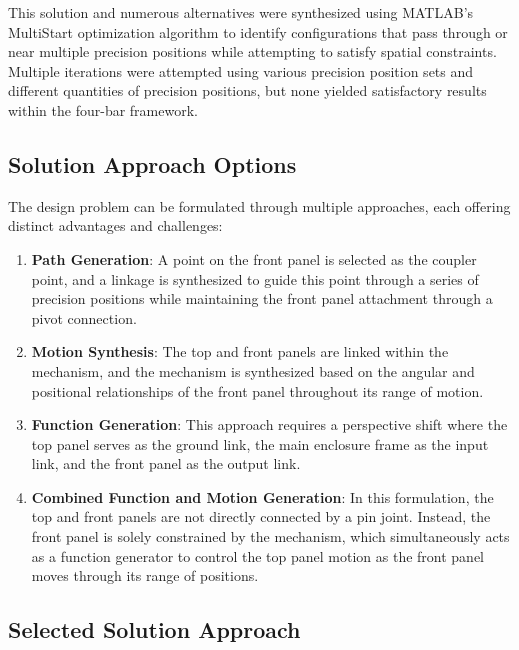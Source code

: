 \documentclass[12pt]{article}
\begin{document}
This solution and numerous alternatives were synthesized using MATLAB's MultiStart optimization algorithm to identify configurations that pass through or near multiple precision positions while attempting to satisfy spatial constraints. Multiple iterations were attempted using various precision position sets and different quantities of precision positions, but none yielded satisfactory results within the four-bar framework.

\subsection{Solution Approach Options}
\label{sec:approach_options}

The design problem can be formulated through multiple approaches, each offering distinct advantages and challenges:

\begin{enumerate}
    \item \textbf{Path Generation}: A point on the front panel is selected as the coupler point, and a linkage is synthesized to guide this point through a series of precision positions while maintaining the front panel attachment through a pivot connection.
    
    \item \textbf{Motion Synthesis}: The top and front panels are linked within the mechanism, and the mechanism is synthesized based on the angular and positional relationships of the front panel throughout its range of motion.
    
    \item \textbf{Function Generation}: This approach requires a perspective shift where the top panel serves as the ground link, the main enclosure frame as the input link, and the front panel as the output link.
    
    \item \textbf{Combined Function and Motion Generation}: In this formulation, the top and front panels are not directly connected by a pin joint. Instead, the front panel is solely constrained by the mechanism, which simultaneously acts as a function generator to control the top panel motion as the front panel moves through its range of positions.
\end{enumerate}

\subsection{Selected Solution Approach}
\label{sec:selected_approach}
\end{document}
